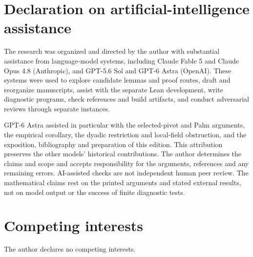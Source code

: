 

\section*{Declaration on artificial-intelligence assistance}
\label{sec:ai-assistance}
The research was organized and directed by the author with substantial
assistance from language-model systems, including Claude Fable 5 and
Claude Opus 4.8 (Anthropic), and GPT-5.6 Sol and GPT-6 Astra (OpenAI).
These systems were used to explore candidate lemmas and proof routes,
draft and reorganize manuscripts, assist with the separate Lean development,
write diagnostic programs, check references and build artifacts, and
conduct adversarial reviews through separate instances.

GPT-6 Astra assisted in particular with the selected-pivot and Palm
arguments, the empirical corollary, the dyadic restriction and local-field
obstruction, and the exposition, bibliography and preparation of this
edition. This attribution preserves the other models' historical
contributions. The author determines the claims and scope and accepts
responsibility for the arguments, references and any remaining errors.
AI-assisted checks are not independent human peer review. The
mathematical claims rest on the printed arguments and stated external
results, not on model output or the success of finite diagnostic tests.

\section*{Competing interests}
The author declares no competing interests.

